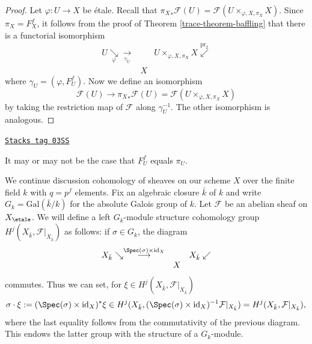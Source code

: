 \begin{proof}

Let $\varphi : U \to X$ be \'etale. Recall that
${\pi_X}_* \mathcal{F} (U) = \mathcal{F} (U \times_{\varphi, X, \pi_X} X)$.
Since $\pi_X = F_X^f$, it follows from the proof of
Theorem \ref{trace-theorem-baffling} that there is a functorial isomorphism
$$
\begin{array}{ccc}U \underset{\varphi}{\searrow}\underset{\gamma_U}{\longrightarrow} &  & U \times_{\varphi, X, \pi_X} X \overset{\text{pr}_2}{\swarrow} \\  & X & \end{array}
$$
where $\gamma_U = (\varphi, F_U^f)$. Now we define an
isomorphism
$$
\mathcal{F} (U) \longrightarrow {\pi_X}_* \mathcal{F} (U) =
\mathcal{F} (U \times_{\varphi, X, \pi_X} X)
$$
by taking the restriction map of $\mathcal{F}$ along $\gamma_U^{-1}$.
The other isomorphism is analogous.
\end{proof}

\begin{remark}
\label{trace-remark-may-be-confusing}
\href{https://stacks.math.columbia.edu/tag/03SS}{\texttt{Stacks tag 03SS}}

It may or may not be the case that $F^f_U$ equals $\pi_U$.
\end{remark}

We continue discussion cohomology of sheaves on our scheme $X$ over
the finite field $k$ with $q = p^f$ elements.
Fix an algebraic closure $\bar k$ of $k$ and write $G_k =
\text{Gal}(\bar k/k)$ for the absolute Galois group of $k$.
Let $\mathcal{F}$ be an abelian sheaf on $X_\etale$.
We will define a left $G_k$-module structure
cohomology group $H^j (X_{\bar k}, \mathcal{F}|_{X_{\bar k}})$
as follows: if $\sigma \in G_k$, the diagram
$$
\begin{array}{ccc}X_{\bar k} \searrow\overset{\Spec(\sigma) \times \text{id}_X}{\longrightarrow} &  & X_{\bar k} \swarrow \\  & X & \end{array}
$$
commutes. Thus we can set, for $\xi \in H^j (X_{\bar k}, \mathcal{F}|_{X_{\bar
k}})$
$$
\sigma \cdot \xi := (\Spec(\sigma) \times \text{id}_X)^*\xi \in
H^j(X_{\bar k}, (\Spec(\sigma) \times \text{id}_X)^{-1}
\mathcal{F}|_{X_{\bar k}})
= H^j (X_{\bar k}, \mathcal{F}|_{X_{\bar k}}),
$$
where the last equality follows from the commutativity of the previous diagram.
This endows the latter group with the structure of a $G_k$-module.

